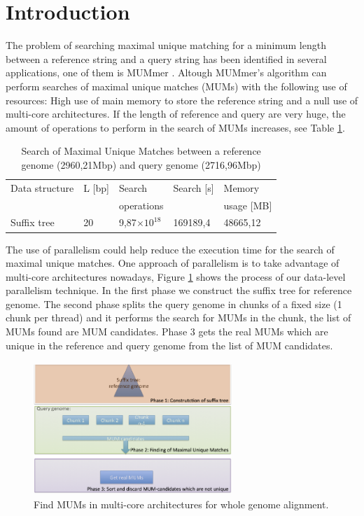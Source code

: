\documentclass[3p,times]{elsarticle}
\providecommand{\e}[1]{\ensuremath{\times 10^{#1}}}
\begin{document}

\section{Introduction} 
\label{}
The problem of searching maximal unique matching for a minimum length between a reference
string and a query string has been
identified in several applications, one of them is MUMmer \cite{Delcher2003}. Altough
MUMmer's algorithm can perform searches of maximal unique matches (MUMs)
with the following use of resources: High use of main memory to store the reference string and a null use of multi-core architectures.
If the length of reference and query are very huge, the amount of operations to perform
in the search of MUMs increases, see Table \ref{tbl:operations}.
\begin{table}[ h!]
  \begin{small}
    \begin{center}
      \begin{tabular}{lllll}
        Data structure & L [bp] & Search  & Search [s] & Memory\\
        & & operations & & usage [MB]\\
        \hline
        Suffix tree & 20 & 9,87\e{18}  & 169189,4 & 48665,12\\
        \hline
      \end{tabular}
    \end{center}
  \end{small}
  \caption{Search of Maximal Unique Matches between a reference genome (2960,21Mbp) and query genome (2716,96Mbp)}
  \label{tbl:operations}
\end{table}
The use of parallelism could help reduce the execution time for the search of maximal unique matches. One approach of
parallelism is to take advantage of multi-core architectures nowadays, Figure \ref{algorithm} shows the process of our data-level parallelism technique. In the first phase we construct the suffix tree for reference genome. The second phase splits the query genome in chunks of a fixed size (1 chunk per thread) and it performs the search for MUMs in the chunk, the list of MUMs found are MUM candidates. Phase 3 gets the real MUMs which are unique in the reference and query genome from the list of MUM candidates.
\begin{figure}[htb]   
\begin{center} 
  \includegraphics[width=7.5cm,height=5cm]{Phases.png}
\end{center} 
\caption{Find MUMs in multi-core architectures for whole genome alignment.} 
\label{algorithm} 
\end{figure} 
\end{document}
